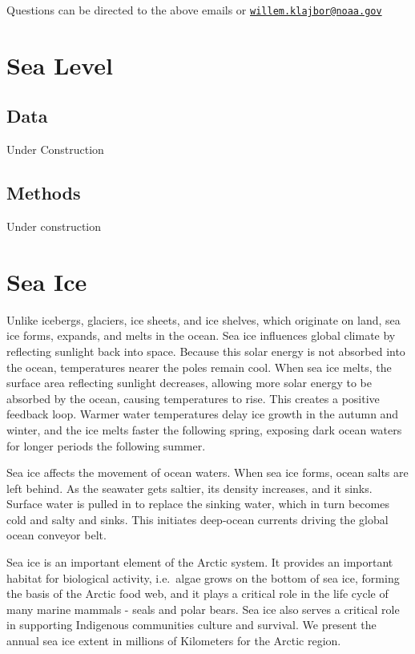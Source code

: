\documentclass[
]{book}
\begin{document}
Questions can be directed to the above emails or \href{mailto:willem.klajbor@noaa.gov}{\nolinkurl{willem.klajbor@noaa.gov}}

\hypertarget{sea-level}{%
\chapter{Sea Level}\label{sea-level}}

\hypertarget{data-9}{%
\section{Data}\label{data-9}}

Under Construction

\hypertarget{methods-9}{%
\section{Methods}\label{methods-9}}

Under construction

\hypertarget{sea-ice}{%
\chapter{Sea Ice}\label{sea-ice}}

Unlike icebergs, glaciers, ice sheets, and ice shelves, which originate on land, sea ice forms, expands, and melts in the ocean. Sea ice influences global climate by reflecting sunlight back into space. Because this solar energy is not absorbed into the ocean, temperatures nearer the poles remain cool. When sea ice melts, the surface area reflecting sunlight decreases, allowing more solar energy to be absorbed by the ocean, causing temperatures to rise. This creates a positive feedback loop. Warmer water temperatures delay ice growth in the autumn and winter, and the ice melts faster the following spring, exposing dark ocean waters for longer periods the following summer.

Sea ice affects the movement of ocean waters. When sea ice forms, ocean salts are left behind. As the seawater gets saltier, its density increases, and it sinks. Surface water is pulled in to replace the sinking water, which in turn becomes cold and salty and sinks. This initiates deep-ocean currents driving the global ocean conveyor belt.

Sea ice is an important element of the Arctic system. It provides an important habitat for biological activity, i.e.~algae grows on the bottom of sea ice, forming the basis of the Arctic food web, and it plays a critical role in the life cycle of many marine mammals - seals and polar bears. Sea ice also serves a critical role in supporting Indigenous communities culture and survival. We present the annual sea ice extent in millions of Kilometers for the Arctic region.
\end{document}

